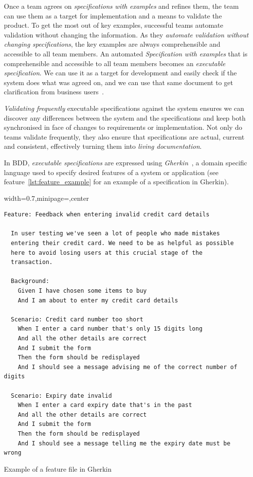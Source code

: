 \documentclass[dissertation,final]{softeng}
\newenvironment{featurecode}[1]
{ \lrbox\featurebox \begin{adjustbox}{width=#1\textwidth,minipage=\textwidth,center} }
{ \end{adjustbox}\endlrbox}
\newenvironment{featurelist}[2]
{
\newcommand{\setcaption}{\caption{#1}}
\newcommand{\setlabel}{\label{#2}}
}
{\begin{listing}\centering\usebox\featurebox\setcaption\setlabel\end{listing}}
\begin{document}
Once a team agrees on \emph{specifications with examples} and refines them, the team can use them as a target for implementation and a means to validate the product. To get the most out of key examples, successful teams automate validation without changing the information. As they\emph{ automate validation without changing specifications}, the key examples are always comprehensible and accessible to all team members. An automated \emph{Specification with examples} that is comprehensible and accessible to all team members becomes an \emph{executable specification}. We can use it as a target for development and easily check if the system does what was agreed on, and we can use that same document to get clarification from business users~\citep{Adzic201106}.

\emph{Validating frequently} executable specifications against the system ensures we can discover any differences between the system and the specifications and keep both synchronised in face of changes to requirements or implementation. Not only do teams validate frequently, they also ensure that specifications are actual, current and consistent, effectively turning them into \emph{living documentation}.

In BDD, \emph{executable specifications} are expressed using \emph{Gherkin}~\citep{wynne2012cucumber}, a domain specific language used to specify desired features of a system or application (see feature~\ref{lst:feature_example} for an example of a specification in Gherkin). 

\begin{featurelist}{Example of a feature file in Gherkin~\citep{wynne2012cucumber}}{lst:feature_example}
\begin{featurecode}{0.7}
\begin{verbatim}
Feature: Feedback when entering invalid credit card details

  In user testing we've seen a lot of people who made mistakes
  entering their credit card. We need to be as helpful as possible
  here to avoid losing users at this crucial stage of the
  transaction.

  Background:
    Given I have chosen some items to buy
    And I am about to enter my credit card details

  Scenario: Credit card number too short
    When I enter a card number that's only 15 digits long
    And all the other details are correct
    And I submit the form
    Then the form should be redisplayed
    And I should see a message advising me of the correct number of digits

  Scenario: Expiry date invalid
    When I enter a card expiry date that's in the past
    And all the other details are correct
    And I submit the form
    Then the form should be redisplayed
    And I should see a message telling me the expiry date must be wrong
\end{verbatim}
\end{featurecode}
\end{featurelist}
\end{document}
